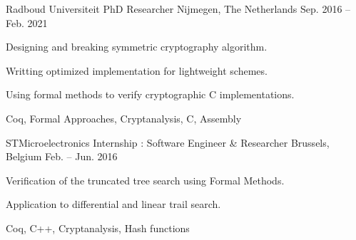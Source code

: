 \begin{cventries}
	\cventrysix%
	{Radboud Universiteit} %
	{PhD Researcher} %
	{Nijmegen, The Netherlands} %
	{Sep. 2016 -- Feb. 2021} %
	{
		\begin{cvitems} %
			\item {Designing and breaking symmetric cryptography algorithm.}
			\item {Writting optimized implementation for lightweight schemes.}
			\item {Using formal methods to verify cryptographic C implementations.}
		\end{cvitems}
	}%
	{Coq, Formal Approaches, Cryptanalysis, C, Assembly}%


	\cventrysix%
	{STMicroelectronics} %
	{Internship : Software Engineer \& Researcher} %
	{Brussels, Belgium} %
	{Feb. -- Jun. 2016} %
	{
		\begin{cvitems} %
			\item {Verification of the truncated tree search using Formal Methods.} %
			\item {Application to differential and linear trail search.} %
		\end{cvitems}
	}%
	{Coq, C++, Cryptanalysis, Hash functions}%




\end{cventries}
